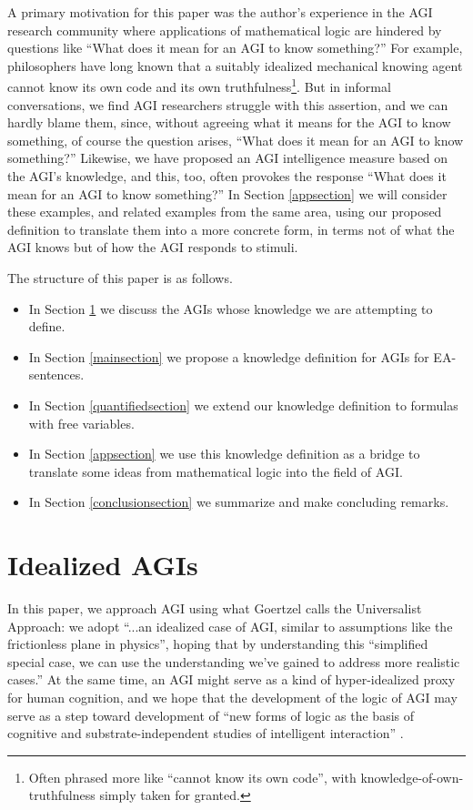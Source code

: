 \documentclass[runningheads]{llncs}
\begin{document}
A primary motivation for this
paper was the author's experience in the AGI research community where applications
of mathematical logic are hindered by questions like ``What does it mean
for an AGI to know something?'' For example, philosophers
have long known that a suitably idealized mechanical
knowing agent cannot know its own code and its own truthfulness\footnote{Often
phrased more like ``cannot know its own code'', with knowledge-of-own-truthfulness
simply taken for granted.}.
But in informal conversations, we find
AGI researchers struggle with this assertion, and we can hardly blame
them, since, without agreeing what it means for the AGI to know something,
of course the question arises, ``What does it mean for
an AGI to know something?'' Likewise, we have proposed \cite{ioi2} an AGI
intelligence measure based on the AGI's knowledge, and this, too, often
provokes the response ``What does it mean for an AGI to know something?''
In Section \ref{appsection} we will consider these examples, and related
examples from the same area, using our proposed definition to translate
them into a more concrete form, in terms not of what the AGI knows but of
how the AGI responds to stimuli.


The structure of this paper is as follows.
\begin{itemize}
  \item In Section \ref{agisection} we discuss the AGIs whose knowledge we are
  attempting to define.
  \item In Section \ref{mainsection} we propose a knowledge definition for
  AGIs for EA-sentences.
  \item In Section \ref{quantifiedsection} we extend our knowledge definition
  to formulas with free variables.
  \item In Section \ref{appsection} we use this knowledge definition as a bridge
  to translate some ideas from mathematical logic into the field of AGI.
  \item In Section \ref{conclusionsection} we summarize and make concluding remarks.
\end{itemize}

\section{Idealized AGIs}
\label{agisection}

In this paper, we approach AGI using what
Goertzel \cite{goertzel2014artificial} calls
the Universalist Approach:
we adopt ``...an idealized case of AGI, similar to
assumptions like the frictionless plane in physics'', hoping that by
understanding this ``simplified special
case, we can use the understanding we've gained to address more realistic
cases.'' At the same time, an AGI might serve as a kind of hyper-idealized
proxy for human cognition, and we hope that the development of the logic
of AGI may serve as a step toward development of ``new forms of logic as
the basis of cognitive and substrate-independent studies of intelligent interaction''
\cite{cerone2019interdisciplinary}.
\end{document}
